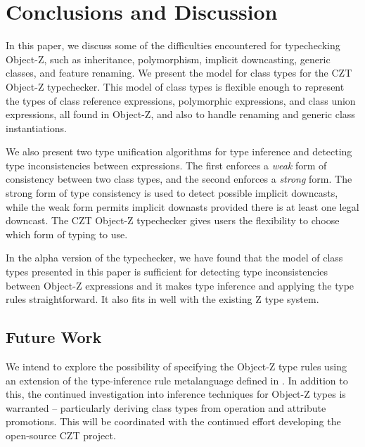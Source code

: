\section{Conclusions and Discussion}

In this paper, we discuss some of the difficulties encountered for
typechecking Object-Z, such as inheritance, polymorphism, implicit
downcasting, generic classes, and feature renaming. We present the
model for class types for the CZT Object-Z typechecker. This model of
class types is flexible enough to represent the types of class
reference expressions, polymorphic expressions, and class union
expressions, all found in Object-Z, and also to handle renaming and
generic class instantiations.

We also present two type unification algorithms for type inference and
detecting type inconsistencies between expressions. The first enforces
a {\em weak} form of consistency between two class types, and the
second enforces a {\em strong} form. The strong form of type
consistency is used to detect possible implicit downcasts, while the
weak form permits implicit downasts provided there is at least one
legal downcast. The CZT Object-Z typechecker gives users the
flexibility to choose which form of typing to use.

In the alpha version of the typechecker, we have found that the model
of class types presented in this paper is sufficient for detecting
type inconsistencies between Object-Z expressions and it makes type
inference and applying the type rules straightforward. It also fits in
well with the existing Z type system.

\subsection{Future Work}

We intend to explore the possibility of specifying the Object-Z type rules
using an extension of the type-inference rule metalanguage defined in 
\theStandard \cite{isoz}. In addition to this, the continued investigation
into inference techniques for Object-Z types is warranted -- particularly
deriving class types from operation and attribute promotions. 
This will be coordinated with the continued effort developing the
open-source CZT project.
